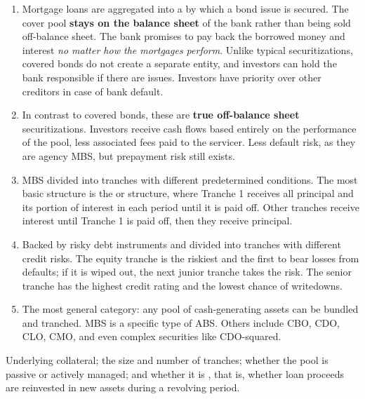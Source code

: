 
\begin{enumerate}
\item {} Mortgage loans are aggregated into a  by which a bond issue is secured. The cover pool \textbf{stays on the
balance sheet} of the bank rather than being sold off-balance sheet. The bank
promises to pay back the borrowed money and interest \emph{no matter how the
mortgages perform}. Unlike typical securitizations, covered bonds do not create a
separate entity, and investors can hold the bank responsible if there are issues.
Investors have priority over other creditors in case of bank default.
\item {} In contrast to covered bonds,
these are \textbf{true off-balance sheet} securitizations. Investors receive cash
flows based entirely on the performance of the pool, less associated fees paid to
the servicer. Less default risk, as they are agency MBS, but prepayment risk still
exists.
\item {} MBS divided into tranches
with different predetermined conditions. The most basic structure is the
 or  structure, where Tranche 1 receives all
principal and its portion of interest in each period until it is paid off. Other
tranches receive interest until Tranche 1 is paid off, then they receive
principal.
\item {} Backed by risky debt instruments and
divided into tranches with different credit risks. The equity tranche is the
riskiest and the first to bear losses from defaults; if it is wiped out, the next
junior tranche takes the risk. The senior tranche has the highest credit rating
and the lowest chance of writedowns.
\item {} The most general category: any pool of
cash-generating assets can be bundled and tranched. MBS is a specific type of ABS.
Others include CBO, CDO, CLO, CMO, and even complex securities like CDO-squared.
\end{enumerate}

\begin{crkeybox}
Underlying collateral; the size and number of tranches; whether the pool is
passive or actively managed; and whether it is , that is, whether
loan proceeds are reinvested in new assets during a revolving period.
\end{crkeybox}

